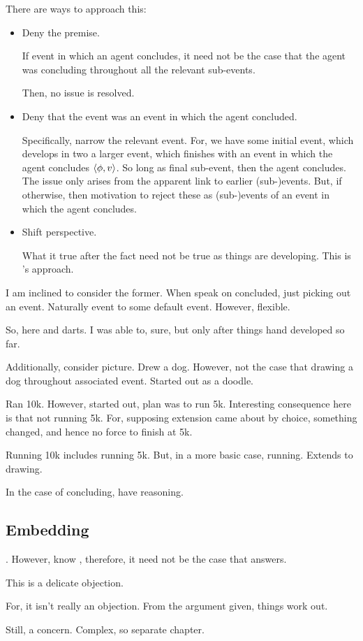 \begin{note}
  There are ways to approach this:
  \begin{itemize}
  \item
    Deny the premise.

    If event in which an agent concludes, it need not be the case that the agent was concluding throughout all the relevant sub-events.

    Then, no issue is resolved.
  \item
    Deny that the event was an event in which the agent concluded.

    Specifically, narrow the relevant event.
    For, we have some initial event, which develops in two a larger event, which finishes with an event in which the agent concludes \(\langle \phi, v \rangle\).
    So long as final sub-event, then the agent concludes.
    The issue only arises from the apparent link to earlier (sub-)events.
    But, if otherwise, then motivation to reject these as (sub-)events of an event in which the agent concludes.
  \item
    Shift perspective.

    What it true after the fact need not be true as things are developing.
    This is \citeauthor{Boylan:2020aa}'s approach.
  \end{itemize}

  I am inclined to consider the former.
  When speak on concluded, just picking out an event.
  Naturally event to some default event.
  However, flexible.

  So, here \citeauthor{Boylan:2020aa} and darts.
  I was able to, sure, but only after things hand developed so far.

  Additionally, consider picture.
  Drew a dog.
  However, not the case that drawing a dog throughout associated event.
  Started out as a doodle.

  Ran 10k.
  However, started out, plan was to run 5k.
  Interesting consequence here is that not running 5k.
  For, supposing extension came about by choice, something changed, and hence no force to finish at 5k.

  Running 10k includes running 5k.
  But, in a more basic case, running.
  Extends to drawing.

  In the case of concluding, have reasoning.
\end{note}

\subsection{Embedding}
\label{sec:embedding}

\begin{note}
  \ros{}.
  However, know \fc{}, therefore, it need not be the case that \ros{} answers.

  This is a delicate objection.

  For, it isn't really an objection.
  From the argument given, things work out.

  Still, a concern.
  Complex, so separate chapter.
\end{note}

